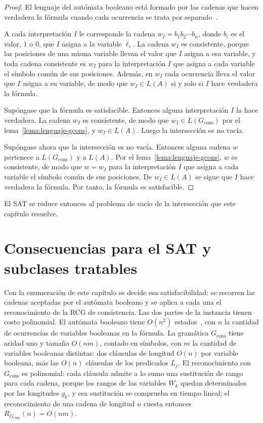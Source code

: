 \documentclass{report}
\theoremstyle{definition}
\theoremstyle{plain}
\theoremstyle{remark}
\begin{document}
\begin{proof}
El lenguaje del autómata booleano está formado por las cadenas que
hacen verdadera la fórmula cuando cada ocurrencia se trata por
separado~\cite{fernandezarias2007}.

A cada interpretación $I$ le corresponde la cadena
$w_I = b_1 b_2 \cdots b_n$, donde $b_i$ es el valor, $1$ o $0$, que
$I$ asigna a la variable $\ell_i$. La cadena $w_I$ es consistente,
porque las posiciones de una misma variable llevan el valor que $I$
asigna a esa variable, y toda cadena consistente es $w_I$ para la
interpretación $I$ que asigna a cada variable el símbolo común de sus
posiciones. Además, en $w_I$ cada ocurrencia lleva el valor que $I$
asigna a su variable, de modo que $w_I \in L(A)$ si y solo si $I$
hace verdadera la fórmula.

Supóngase que la fórmula es satisfacible. Entonces alguna
interpretación $I$ la hace verdadera. La cadena $w_I$ es consistente,
de modo que $w_I \in L(G_{\mathrm{cons}})$ por el
lema~\ref{lema:lenguaje-gcons}, y $w_I \in L(A)$. Luego la
intersección es no vacía.

Supóngase ahora que la intersección es no vacía. Entonces alguna
cadena $w$ pertenece a $L(G_{\mathrm{cons}})$ y a $L(A)$. Por el
lema~\ref{lema:lenguaje-gcons}, $w$ es consistente, de modo que
$w = w_I$ para la interpretación $I$ que asigna a cada variable el
símbolo común de sus posiciones. De $w_I \in L(A)$ se sigue que $I$
hace verdadera la fórmula. Por tanto, la fórmula es satisfacible.
\end{proof}

El SAT se reduce entonces al problema de vacío de la intersección que
este capítulo resuelve.

\section{Consecuencias para el SAT y subclases tratables}
\label{sec:lectura-sat}

Con la enumeración de este capítulo se decide esa satisfacibilidad: se
recorren las cadenas aceptadas por el autómata booleano y se aplica a
cada una el reconocimiento de la RCG de consistencia. Las dos partes
de la instancia tienen costo polinomial. El autómata booleano tiene
$O(n^2)$ estados~\cite{fernandezarias2007}, con $n$ la cantidad de
ocurrencias de variables booleanas en la fórmula. La gramática
$G_{\mathrm{cons}}$ tiene aridad uno y tamaño $O(nm)$, contado en
símbolos, con $m$ la cantidad de variables booleanas distintas: dos
cláusulas de longitud $O(n)$ por variable booleana, más las $O(n)$
cláusulas de los predicados $L_j$. El reconocimiento con
$G_{\mathrm{cons}}$ es polinomial: cada cláusula admite a lo sumo una sustitución de rango
para cada cadena, porque los rangos de las variables $W_k$ quedan
determinados por las longitudes $g_k$, y esa sustitución se comprueba
en tiempo lineal; el reconocimiento de una cadena de longitud $n$
cuesta entonces $R_{G_{\mathrm{cons}}}(n) = O(nm)$.
\end{document}
